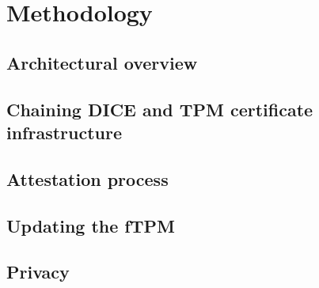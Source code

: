 
\chapter{Methodology}\label{chapter:methodology}

\section{Architectural overview}


\section{Chaining DICE and TPM certificate infrastructure}

\section{Attestation process}

\section{Updating the fTPM}


\section{Privacy}
